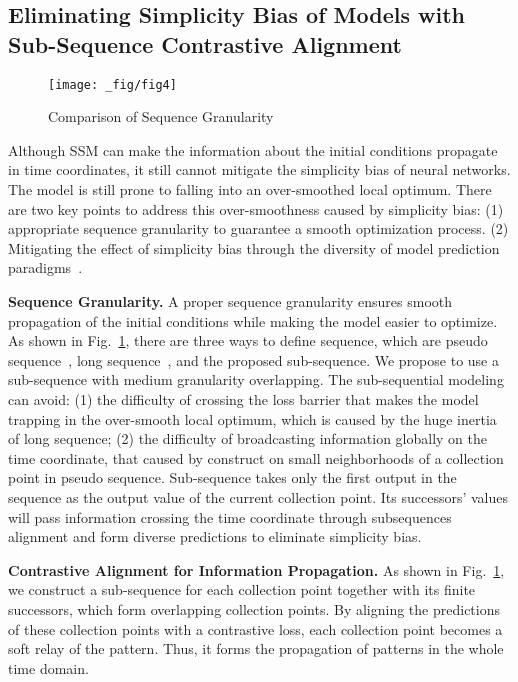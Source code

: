 \subsection{Eliminating Simplicity Bias of Models with Sub-Sequence Contrastive Alignment}
\label{sec:subseq}


\begin{figure}[t!]
    \centering
    \texttt{[image: \_fig/fig4]}
    \vspace{-5mm}
    \caption{Comparison of Sequence Granularity}
    \label{fig4}
    \vspace{-6mm}
\end{figure}





Although SSM can make the information about the initial conditions propagate in time coordinates, it still cannot mitigate the simplicity bias of neural networks. 
    The model is still prone to falling into an over-smoothed local optimum. 
        There are two key points to address this over-smoothness caused by simplicity bias: (1) appropriate sequence granularity to guarantee a smooth optimization process. (2) Mitigating the effect of simplicity bias through the diversity of model prediction paradigms~\cite{pagliardiniagree}. 
        
        \textbf{Sequence Granularity.} A proper sequence granularity ensures smooth propagation of the initial conditions while making the model easier to optimize. As shown in Fig.~\ref{fig4}, there are three ways to define sequence, which are pseudo sequence~\cite{zhao2024pinnsformer}, long sequence~\cite{nguyen2024sequence}, and the proposed sub-sequence.
        We propose to use a sub-sequence with medium granularity overlapping. The sub-sequential modeling can avoid: (1) the difficulty of crossing the loss barrier that makes the model trapping in the over-smooth local optimum, which is caused by the huge inertia of long sequence; (2) the difficulty of broadcasting information globally on the time coordinate, that caused by construct on small neighborhoods of a collection point in pseudo sequence. Sub-sequence takes only the first output in the sequence as the output value of the current collection point. Its successors' values will pass information crossing the time coordinate through subsequences alignment and form diverse predictions to eliminate simplicity bias.

\textbf{Contrastive Alignment for Information Propagation.} As shown in Fig.~\ref{fig4}, we construct a sub-sequence for each collection point together with its finite successors, which form overlapping collection points. By aligning the predictions of these collection points with a contrastive loss, each collection point becomes a soft relay of the pattern. Thus, it forms the propagation of patterns in the whole time domain.%


